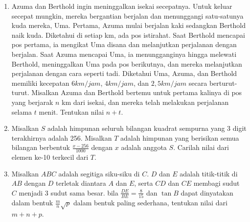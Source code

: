 \documentclass[12pt]{scrartcl}
\begin{document}
\begin{enumerate}
		\item
		Azuma dan Berthold ingin meninggalkan isekai secepatnya. Untuk keluar secepat mungkin, mereka bergantian berjalan dan menunggangi satu-satunya kuda mereka, Uma. Pertama, Azuma mulai berjalan kaki sedangkan Berthold naik kuda. Diketahui di setiap km, ada pos istirahat. Saat Berthold mencapai pos pertama, ia mengikat Uma disana dan melanjutkan perjalanan dengan berjalan. Saat Azuma mencapai Uma, ia menungganginya hingga melewati Berthold, meninggalkan Uma pada pos berikutnya, dan mereka melanjutkan perjalanan dengan cara seperti tadi. Diketahui Uma, Azuma, dan Berthold memiliki kecepatan $6 km/jam$, $4 km/jam$, dan $2,5 km/jam$ secara berturut-turut. Misalkan Azuma dan Berthold bertemu untuk pertama kalinya di pos yang berjarak $n$ km dari isekai, dan mereka telah melakukan perjalanan selama $t$ menit. Tentukan nilai $n+t$.
		
		\item
		Misalkan $S$ adalah himpunan seluruh bilangan kuadrat sempurna yang 3 digit terakhirnya adalah 256. Misalkan $T$ adalah himpunan yang berisikan semua bilangan berbentuk $\frac{x-256}{1000}$ dengan $x$ adalah anggota $S$. Carilah nilai dari elemen ke-10 terkecil dari $T$.
		
		\item
		Misalkan $ABC$ adalah segitiga siku-siku di $C$. $D$ dan $E$ adalah titik-titik di $AB$ dengan $D$ terletak diantara $A$ dan $E$, serta $CD$ dan $CE$ membagi sudut $C$ menjadi 3 sudut sama besar. bila $\frac{DE}{BE} = \frac{8}{15}$ dan $\tan B$ dapat dinyatakan dalam bentuk $\frac{m}{n}\sqrt{p}$ dalam bentuk paling sederhana, tentukan nilai dari $m+n+p$.
	\end{enumerate}
\end{document}
